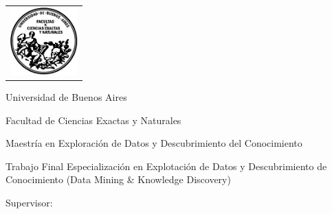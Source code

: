 \newcommand{\HRule}{\rule{\linewidth}{0.2mm}}
%
\thispagestyle{empty}

\begin{center}\leavevmode

\vspace{-2cm}

\begin{tabular}{l}
\includegraphics[width=2.6cm]{logofcen.pdf}
\end{tabular}


{\large \sc Universidad de Buenos Aires

Facultad de Ciencias Exactas y Naturales}

\vspace{0.5cm}

{\large \sc Maestría en Exploración de Datos y 
Descubrimiento del Conocimiento}

\vspace{5.0cm}


\begin{huge}
\textbf{\tituloTesis}
\end{huge}

\vspace{2cm}

{\large Trabajo Final Especialización en Explotación de Datos y Descubrimiento de Conocimiento (Data Mining \& Knowledge Discovery) }

\vspace{2cm}

{\Large \autor}

\end{center}

\vfill

{\large

{Supervisor: \director}



\vspace{.2cm}

\lugar
}

\newpage\thispagestyle{empty}
